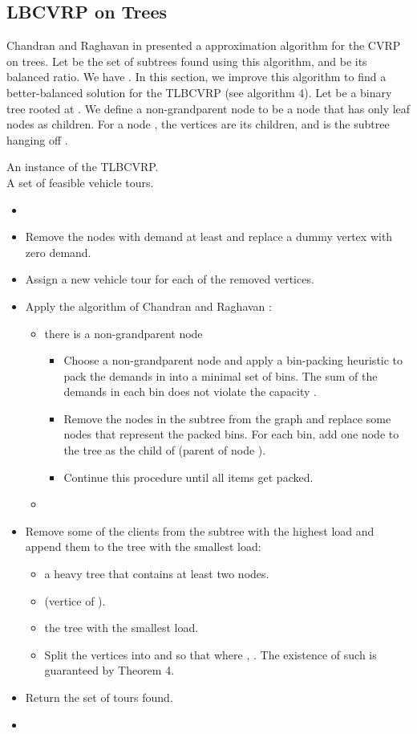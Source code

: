 \subsection{LBCVRP on Trees}
\noindent  Chandran and Raghavan in \cite{Chandran} presented a approximation algorithm for the CVRP on trees. Let  be the set of subtrees found using this algorithm, and  be its balanced ratio. We have . In this section, we improve this algorithm to find a better-balanced solution for the TLBCVRP (see algorithm 4). Let  be a binary tree rooted at . We define a non-grandparent node to be a node that has only leaf nodes as children. For a node , the vertices  are its children, and  is the subtree hanging off .

\begin{algorithm}
\caption {} 
 An instance of the TLBCVRP.\\
 A set of feasible vehicle tours. 
\begin{itemize}
\item[] 
\item[] Remove the nodes with demand at least  and replace a dummy vertex with zero demand.
\item[] Assign a new vehicle tour for each of the removed vertices. 
\item[] Apply the algorithm of Chandran and Raghavan \cite{Chandran}:
\begin{itemize}
\item[]  there is a non-grandparent node 
\begin{itemize}
\item[] Choose a non-grandparent node  and apply a bin-packing heuristic to pack the demands in  into a minimal set of bins. The sum of the demands in each bin does not violate the capacity . 
\item[] Remove the nodes in the subtree  from the graph and replace some nodes that represent the packed bins. For each bin, add one node to the tree as the child of  (parent of node ).  
\item[] Continue this procedure until all items get packed. 
\end{itemize}
\item[] 
\end{itemize}
\item[] Remove some of the clients from the subtree with the highest load and append them to the tree with the smallest load:
\begin{itemize}
\item[]  a heavy tree that contains at least two nodes.
\item[]  (vertice of ).
\item[]  the tree with the smallest load. 
\item[] Split the vertices  into  and  so that 
\noindent where , . The existence of such   is guaranteed by Theorem 4. 
\end{itemize}
\item[] Return the set of tours found.
\item[] 
\end{itemize}
\end{algorithm}

